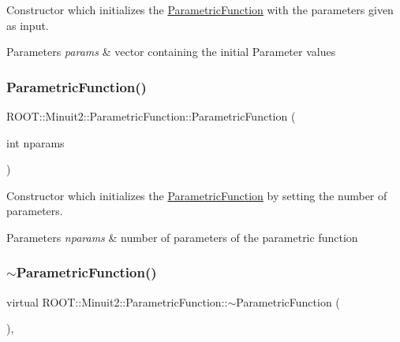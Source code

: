 Constructor which initializes the \mbox{\hyperlink{classROOT_1_1Minuit2_1_1ParametricFunction}{Parametric\+Function}} with the parameters given as input.


\begin{DoxyParams}{Parameters}
{\em params} & vector containing the initial Parameter values \\
\hline
\end{DoxyParams}
\mbox{\label{classROOT_1_1Minuit2_1_1ParametricFunction_a0b8e823b3a61fc0f20ffe419e0fa1e1a}} 
\subsubsection{\texorpdfstring{ParametricFunction()}{ParametricFunction()}\hspace{0.1cm}{\footnotesize\ttfamily [4/6]}}
{\footnotesize\ttfamily R\+O\+O\+T\+::\+Minuit2\+::\+Parametric\+Function\+::\+Parametric\+Function (\begin{DoxyParamCaption}\item[{int}]{nparams }\end{DoxyParamCaption})\hspace{0.3cm}{\ttfamily [inline]}}

Constructor which initializes the \mbox{\hyperlink{classROOT_1_1Minuit2_1_1ParametricFunction}{Parametric\+Function}} by setting the number of parameters.


\begin{DoxyParams}{Parameters}
{\em nparams} & number of parameters of the parametric function \\
\hline
\end{DoxyParams}
\mbox{\label{classROOT_1_1Minuit2_1_1ParametricFunction_a18aae731e634b4fc1c79403d8f49caa9}} 
\subsubsection{\texorpdfstring{$\sim$ParametricFunction()}{~ParametricFunction()}\hspace{0.1cm}{\footnotesize\ttfamily [2/3]}}
{\footnotesize\ttfamily virtual R\+O\+O\+T\+::\+Minuit2\+::\+Parametric\+Function\+::$\sim$\+Parametric\+Function (\begin{DoxyParamCaption}{ }\end{DoxyParamCaption})\hspace{0.3cm}{\ttfamily [inline]}, {\ttfamily [virtual]}}

